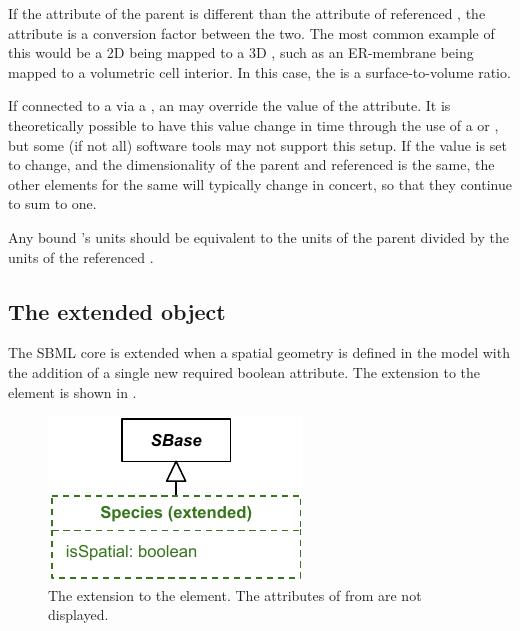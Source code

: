 If the  attribute of the parent \Compartment is different than the  attribute of referenced \DomainType, the  attribute is a conversion factor between the two.  The most common example of this would be a 2D \Compartment being mapped to a 3D \DomainType, such as an ER-membrane being mapped to a volumetric cell interior.  In this case, the  is a surface-to-volume ratio.

If connected to a \Parameter via a \SpatialSymbolReference, an \InitialAssignment may override the value of the  attribute.  It is theoretically possible to have this value change in time through the use of a \Rule or \Event, but some (if not all) software tools may not support this setup.  If the value is set to change, and the dimensionality of the parent \Compartment and referenced \DomainType is the same, the other \CompartmentMapping elements for the same \DomainType will typically change in concert, so that they continue to sum to one.

Any bound \Parameter's units should be equivalent to the units of the parent \Compartment divided by the units of the referenced \DomainType. 



\subsection{The extended \Species object}
\label{extended-species-class}
The SBML core \Species is extended when a spatial geometry is defined in the model with the addition of a single new required boolean  attribute.  The extension to the \Species element is shown in .
 
\begin{figure}[ht]
  \includegraphics{figs/extended-species-uml}
  \caption{The extension to the \Species element. The attributes of \Species from \sbmlthreecore are not displayed.}
  \label{species-uml}
\end{figure}




